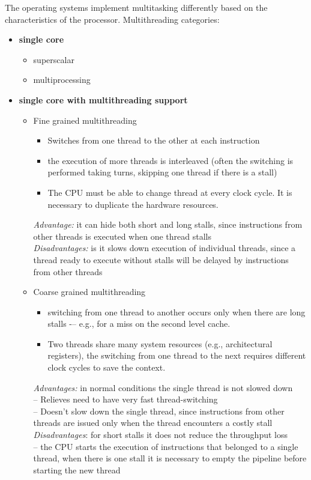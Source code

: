 The operating systems implement multitasking differently based on the characteristics of the processor.
Multithreading categories:
\begin{itemize}
    \item \textbf{single core}
    \begin{itemize}
        \item superscalar
        \item multiprocessing
    \end{itemize}

    \item \textbf{single core with multithreading support} 
    \begin{itemize}
        \item Fine grained multithreading
        \begin{itemize}
            \item Switches from one thread to the other at each instruction
            \item the execution of more threads is interleaved (often the switching is performed taking turns,
            skipping one thread if there is a stall)
            \item The CPU must be able to change thread at every clock cycle.
            It is necessary to duplicate the hardware resources.
        \end{itemize}
        \textrightarrow \textit{Advantage:} it can hide both short and long stalls, since instructions from other
        threads is executed when one thread stalls\\
        \textrightarrow \textit{Disadvantages:} is it slows down execution of individual threads, since a thread ready to
        execute without stalls will be delayed by instructions from other threads


        \item Coarse grained multithreading
        \begin{itemize}
            \item switching from one thread to another occurs only when there are long stalls -– e.g., for a miss on
            the second level cache.
            \item Two threads share many system resources (e.g., architectural registers), the switching from one
            thread to the next requires different clock cycles to save the context.
        \end{itemize}
        \textrightarrow \textit{Advantages:} in normal conditions the single thread is not slowed down\\
        – Relieves need to have very fast thread-switching\\
        – Doesn’t slow down the single thread, since instructions from other threads are issued only when the thread
        encounters a costly stall\\
        \textrightarrow \textit{Disadvantages}: for short stalls it does not reduce the throughput loss\\
        – the CPU starts the execution of instructions that belonged to a single thread, when there is one stall it is
        necessary to empty the pipeline before starting the new thread


\end{itemize}
\end{itemize}
